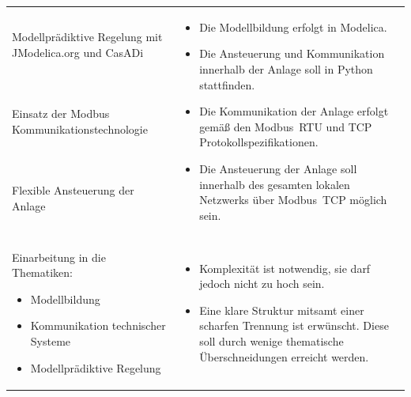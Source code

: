 \begin{table}[H]
\begin{tabularx}{1\textwidth}{m{}m{}}
\addlinespace[1mm] Modellprädiktive Regelung mit JModelica.org und CasADi \newline & \multirow{3}{\hsize}{
\begin{minipage}[t]{0.57\textwidth}
\begin{itemize}[itemsep=0pt,topsep=0pt,leftmargin=5mm]
\item Die Modellbildung erfolgt in Modelica.
\item Die Ansteuerung und Kommunikation innerhalb der Anlage soll in Python stattfinden.
\item Die Kommunikation der Anlage erfolgt gemäß den Modbus~RTU und TCP Protokollspezifikationen.
\item Die Ansteuerung der Anlage soll innerhalb des gesamten lokalen Netzwerks über Modbus~TCP möglich sein.
\end{itemize}
\end{minipage}
}  \\

\cmidrule[0.1pt](lr{2em}){1-1}
\addlinespace[1mm] Einsatz der Modbus \newline Kommunikationstechnologie \newline 	& 		\\

\cmidrule[0.1pt](lr{2em}){1-1}
\addlinespace[1mm] Flexible Ansteuerung der Anlage \newline & \\

\cmidrule[0.5pt](r{0.25em}){1-1} 
\cmidrule[0.5pt](l{0.25em}){2-2}

Einarbeitung in die Thematiken:
\begin{minipage}[t]{0.34\textwidth}
\begin{itemize}[itemsep=0pt,topsep=0pt,leftmargin=4mm]
	\item Modellbildung
	\item Kommunikation technischer \newline Systeme
	\item Modellprädiktive Regelung
\end{itemize}
\end{minipage}
 	& \multirow{2}{\hsize}{
\begin{minipage}[t]{0.57\textwidth}
\begin{itemize}[itemsep=0pt,topsep=0pt,leftmargin=5mm]
	\item Komplexität ist notwendig, sie darf jedoch nicht zu hoch sein.
	\item Eine klare Struktur mitsamt einer scharfen Trennung ist erwünscht. Diese soll durch wenige thematische Überschneidungen erreicht werden.
\end{itemize}
\end{minipage}
}  \\


\end{tabularx}
\end{table}
